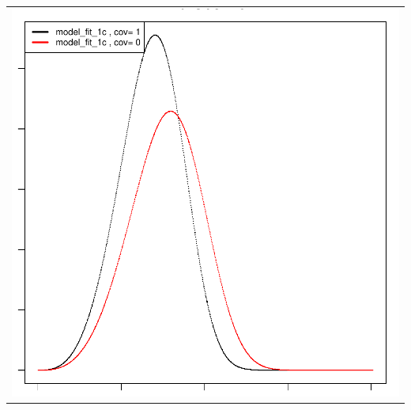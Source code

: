 \documentclass[11pt,a4paper]{article}
\begin{document}
\begin{enumerate}
\begin{minipage}{0.45\textwidth}
\begin{tabular}{|p{\textwidth}}
\includegraphics{SemiMarkov_Paper-018}
\end{tabular}
\end{minipage}%
\end{enumerate}
\end{document}
